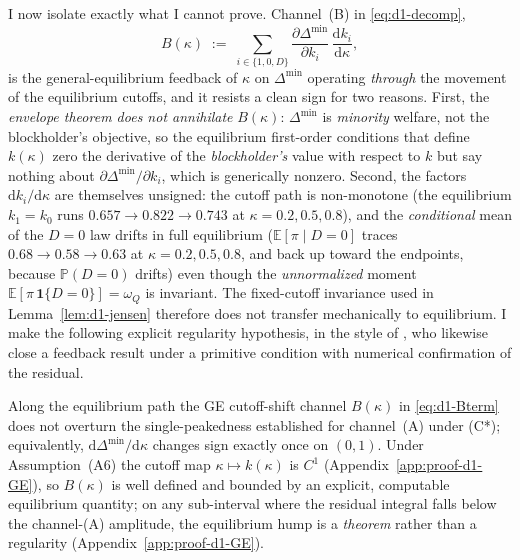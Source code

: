\documentclass[11pt]{article}
\newcommand{\E}{\mathbb{E}}
\newcommand{\PP}{\mathbb{P}}
\newcommand{\1}{\mathbf{1}}
\begin{document}
I now isolate exactly what I cannot prove. Channel~(B) in \eqref{eq:d1-decomp},
\begin{equation}
  B(\kappa)\;:=\;\sum_{i\in\{1,0,D\}}
  \frac{\partial \Delta^{\min}}{\partial k_i}\,\frac{\mathrm{d} k_i}{\mathrm{d}\kappa},
  \label{eq:d1-Bterm}
\end{equation}
is the general-equilibrium feedback of $\kappa$ on $\Delta^{\min}$ operating
\emph{through} the movement of the equilibrium cutoffs, and it resists a clean
sign for two reasons. First, the \emph{envelope theorem does not annihilate}
$B(\kappa)$: $\Delta^{\min}$ is \emph{minority} welfare, not the blockholder's
objective, so the equilibrium first-order conditions that define $k(\kappa)$ zero
the derivative of the \emph{blockholder's} value with respect to $k$ but say
nothing about $\partial\Delta^{\min}/\partial k_i$, which is generically nonzero.
Second, the factors $\mathrm{d} k_i/\mathrm{d}\kappa$ are themselves unsigned: the cutoff
path is non-monotone (the equilibrium $k_1=k_0$ runs
$0.657\!\to\!0.822\!\to\!0.743$ at $\kappa=0.2,0.5,0.8$), and the
\emph{conditional} mean of the $D=0$ law drifts in full equilibrium
($\E[\pi\mid D=0]$ traces $0.68\to0.58\to0.63$ at $\kappa=0.2,0.5,0.8$, and back up toward the endpoints, because
$\PP(D=0)$ drifts) even though the \emph{unnormalized} moment
$\E[\pi\,\1\{D=0\}]=\omega_Q$ is invariant. The fixed-cutoff invariance used in
Lemma~\ref{lem:d1-jensen} therefore does not transfer mechanically to
equilibrium. I make the following explicit regularity hypothesis, in the style
of \citet{EdmansGoldsteinJiang2015}, who likewise close a feedback result under
a primitive condition with numerical confirmation of the residual.

\begin{hypothesis}
\label{hyp:d1-cutoffshift}
Along the equilibrium path the GE cutoff-shift channel $B(\kappa)$ in
\eqref{eq:d1-Bterm} does not overturn the single-peakedness established for
channel~(A) under \textup{(C*)}; equivalently,
$\mathrm{d}\Delta^{\min}/\mathrm{d}\kappa$ changes sign exactly once on $(0,1)$. Under
Assumption~\textup{(A6)} the cutoff map $\kappa\mapsto k(\kappa)$ is $C^1$
(Appendix~\ref{app:proof-d1-GE}), so $B(\kappa)$ is well defined and bounded by
an explicit, computable equilibrium quantity; on any sub-interval where the
residual integral falls below the channel-(A) amplitude, the equilibrium hump is
a \emph{theorem} rather than a regularity (Appendix~\ref{app:proof-d1-GE}).
\end{hypothesis}
\end{document}
